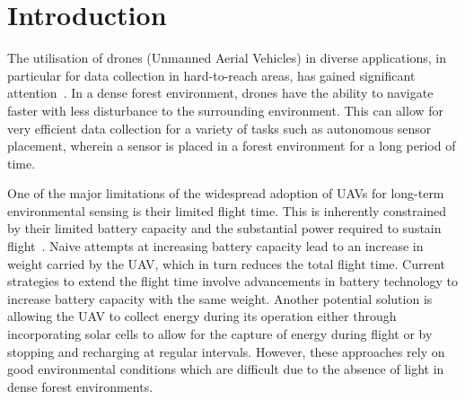 \chapter{Introduction}

The utilisation of drones (Unmanned Aerial Vehicles) in diverse applications, in particular for data collection in hard-to-reach areas, has gained significant attention~\cite{droneReview}.
In a dense forest environment, drones have the ability to navigate faster with less disturbance to the surrounding environment.
This can allow for very efficient data collection for a variety of tasks \cite{environmentalSensing} such as autonomous sensor placement, wherein a sensor is placed in a forest environment for a long period of time.

One of the major limitations of the widespread adoption of UAVs for long-term environmental sensing is their limited flight time.
This is inherently constrained by their limited battery capacity and the substantial power required to sustain flight~\cite{droneBattery}.
Naive attempts at increasing battery capacity lead to an increase in weight carried by the UAV, which in turn reduces the total flight time.
Current strategies to extend the flight time involve advancements in battery technology to increase battery capacity with the same weight.
Another potential solution is allowing the UAV to collect energy during its operation either through incorporating solar cells to allow for the capture of energy during flight \cite{droneSunlight} or by stopping and recharging at regular intervals.
However, these approaches rely on good environmental conditions which are difficult due to the absence of light in dense forest environments.

